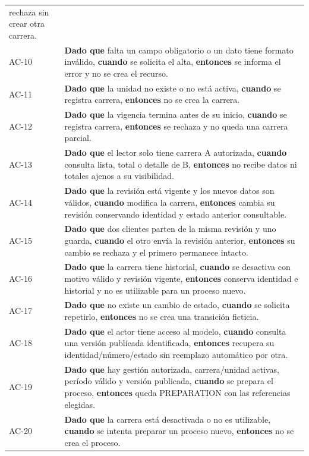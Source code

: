 \documentclass[12pt,a4paper]{report}
\begin{document}
{\begin{longtable}[]{@{}
  >{\raggedright\arraybackslash}p{}
  >{\raggedright\arraybackslash}p{}@{}}
rechaza sin crear otra carrera. \\
AC-10 & \textbf{Dado que} falta un campo obligatorio o un dato tiene
formato inválido, \textbf{cuando} se solicita el alta, \textbf{entonces}
se informa el error y no se crea el recurso. \\
AC-11 & \textbf{Dado que} la unidad no existe o no está activa,
\textbf{cuando} se registra carrera, \textbf{entonces} no se crea la
carrera. \\
AC-12 & \textbf{Dado que} la vigencia termina antes de su inicio,
\textbf{cuando} se registra carrera, \textbf{entonces} se rechaza y no
queda una carrera parcial. \\
AC-13 & \textbf{Dado que} el lector solo tiene carrera A autorizada,
\textbf{cuando} consulta lista, total o detalle de B, \textbf{entonces}
no recibe datos ni totales ajenos a su visibilidad. \\
AC-14 & \textbf{Dado que} la revisión está vigente y los nuevos datos
son válidos, \textbf{cuando} modifica la carrera, \textbf{entonces}
cambia su revisión conservando identidad y estado anterior
consultable. \\
AC-15 & \textbf{Dado que} dos clientes parten de la misma revisión y
uno guarda, \textbf{cuando} el otro envía la revisión anterior,
\textbf{entonces} su cambio se rechaza y el primero permanece
intacto. \\
AC-16 & \textbf{Dado que} la carrera tiene historial, \textbf{cuando}
se desactiva con motivo válido y revisión vigente, \textbf{entonces}
conserva identidad e historial y no es utilizable para un proceso
nuevo. \\
AC-17 & \textbf{Dado que} no existe un cambio de estado,
\textbf{cuando} se solicita repetirlo, \textbf{entonces} no se crea una
transición ficticia. \\
AC-18 & \textbf{Dado que} el actor tiene acceso al modelo,
\textbf{cuando} consulta una versión publicada identificada,
\textbf{entonces} recupera su identidad/número/estado sin reemplazo
automático por otra. \\
AC-19 & \textbf{Dado que} hay gestión autorizada, carrera/unidad
activas, período válido y versión publicada, \textbf{cuando} se prepara
el proceso, \textbf{entonces} queda PREPARATION con las referencias
elegidas. \\
AC-20 & \textbf{Dado que} la carrera está desactivada o no es
utilizable, \textbf{cuando} se intenta preparar un proceso nuevo,
\textbf{entonces} no se crea el proceso. \\

\end{longtable}}
\end{document}
